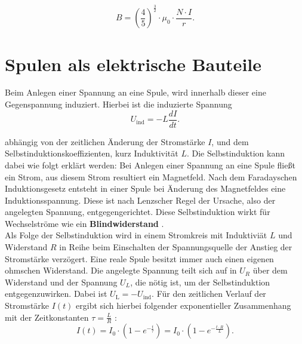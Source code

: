 \documentclass[page,pdftex,12pt,a4paper,twoside,openright]{scrbook}
\begin{document}
\begin{equation}
\label{eq-helmholtz}
B = \left(\frac{4}{5}\right)^{\frac{3}{2}} \cdot \mu_{\mathrm{0}} \cdot \frac{N \cdot I}{r} .
\end{equation}

\section{Spulen als elektrische Bauteile \label{sec-spulen}}
\label{sec:org8293810}
Beim Anlegen einer Spannung an eine Spule, wird innerhalb dieser eine Gegenspannung induziert. Hierbei ist die induzierte Spannung\\

\begin{equation}
\label{eq-induktivitaet}
U_\mathrm{ind} = - L \frac{dI}{dt} .
\end{equation}

abhängig von der zeitlichen Änderung der Stromstärke \(I\), und dem Selbstinduktionskoeffizienten, kurz Induktivität \(L\). Die Selbstinduktion kann dabei wie folgt erklärt werden: Bei Anlegen einer Spannung an eine Spule fließt ein Strom, aus diesem Strom resultiert ein Magnetfeld. Nach dem Faradayschen Induktionsgesetz entsteht in einer Spule bei Änderung des Magnetfeldes eine Induktionsspannung. Diese ist nach Lenzscher Regel der Ursache, also der angelegten Spannung, entgegengerichtet. Diese Selbstinduktion wirkt für Wechselströme wie ein \textbf{Blindwiderstand} \cite{demtroder_experimentalphysik_2017}.\\

Als Folge der Selbstinduktion wird in einem Stromkreis mit Induktiviät \(L\) und Widerstand \(R\) in Reihe beim Einschalten der Spannungsquelle der Anstieg der Stromstärke verzögert. Eine reale Spule besitzt immer auch einen eigenen ohmschen Widerstand. Die angelegte Spannung teilt sich auf in \(U_R\) über dem Widerstand und der Spannung \(U_L\), die nötig ist, um der Selbstinduktion entgegenzuwirken. Dabei ist \(U_{\mathrm{L}} = - U_{\mathrm{ind}}\). Für den zeitlichen Verlauf der Stromstärke \(I(t)\) ergibt sich hierbei folgender exponentieller Zusammenhang mit der Zeitkonstanten \(\tau = \frac{L}{R}\) \cite{raith_elektromagnetismus_2006}:\\

\begin{equation}
\label{eq-strom-spule}
I(t) = I_{\mathrm{0}} \cdot (1 - e^{ -\frac{t}{\tau}})= I_{\mathrm{0}} \cdot (1- e^{ -\frac{t \cdot R}{L}}).
\end{equation}
\end{document}
